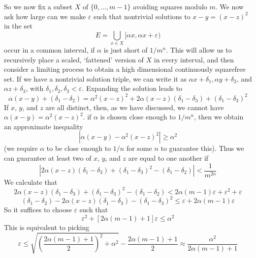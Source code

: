 \documentclass{report}
\theoremstyle{plain}
\theoremstyle{plain}
\begin{document}
So we now fix a subset $X$ of $\{ 0, \dots, m-1 \}$ avoiding squares modulo $m$. We now ask how large can we make $\varepsilon$ such that nontrivial solutions to $x - y = (x - z)^2$ in the set
%
\[ E = \bigcup_{x \in X} [\alpha x, \alpha x + \varepsilon) \]
%
occur in a common interval, if $\alpha$ is just short of $1/m^n$. This will allow us to recursively place a scaled, `fattened' version of $X$ in every interval, and then consider a limiting process to obtain a high dimensional continuously squarefree set. If we have a nontrivial solution triple, we can write it as $\alpha x + \delta_1, \alpha y + \delta_2$, and $\alpha z + \delta_3$, with $\delta_1, \delta_2, \delta_3 < \varepsilon$. Expanding the solution leads to
%
\[ \alpha (x - y) + (\delta_1 - \delta_2) = \alpha^2 (x - z)^2 + 2\alpha(x - z)(\delta_1 - \delta_3) + (\delta_1 - \delta_3)^2 \]
%
If $x$, $y$, and $z$ are all distinct, then, as we have discussed, we cannot have $\alpha (x - y) = \alpha^2 (x - z)^2$. if $\alpha$ is chosen close enough to $1/m^n$, then we obtain an approximate inequality
%
\[ |\alpha (x - y) - \alpha^2 (x - z)^2| \geq \alpha^2 \]
%
(we require $\alpha$ to be close enough to $1/n$ for some $n$ to guarantee this). Thus we can guarantee at least two of $x$, $y$, and $z$ are equal to one another if
%
\[ |2\alpha(x - z)(\delta_1 - \delta_3) + (\delta_1 - \delta_3)^2 - (\delta_1 - \delta_2)| < \frac{1}{m^{2n}} \]
%
We calculate that
%
\[ 2\alpha(x - z)(\delta_1 - \delta_3) + (\delta_1 - \delta_3)^2 - (\delta_1 - \delta_2) < 2\alpha(m-1)\varepsilon + \varepsilon^2 + \varepsilon \]
\[ (\delta_1 - \delta_2) - 2\alpha(x - z)(\delta_1 - \delta_3) - (\delta_1 - \delta_3)^2 \leq \varepsilon + 2\alpha(m-1)\varepsilon \]
%
So it suffices to choose $\varepsilon$ such that
%
\[ \varepsilon^2 + [2\alpha(m-1) + 1]\varepsilon \leq \alpha^2 \]
%
This is equivalent to picking
%
\[ \varepsilon \leq \sqrt{\left( \frac{2 \alpha(m - 1) + 1}{2} \right)^2 + \alpha^2} - \frac{2\alpha(m-1) + 1}{2} \approx \frac{\alpha^2}{2\alpha(m-1) + 1} \]
\end{document}
